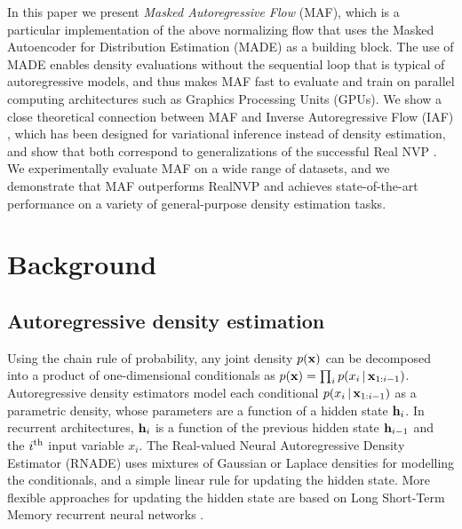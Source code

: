 In this paper we present \emph{Masked Autoregressive Flow} (MAF), which is a particular implementation of the above normalizing flow that uses the Masked Autoencoder for Distribution Estimation (MADE) \citep{Germain:2015} as a building block. The use of MADE enables density evaluations without the sequential loop that is typical of autoregressive models, and thus makes MAF fast to evaluate and train on parallel computing architectures such as Graphics Processing Units (GPUs). We show a close theoretical connection between MAF and Inverse Autoregressive Flow (IAF) \citep{Kingma:2016}, which has been designed for variational inference instead of density estimation, and show that both correspond to generalizations of the successful Real NVP \citep{Dinh:2017}. We experimentally evaluate MAF on a wide range of datasets, and we demonstrate that MAF outperforms RealNVP and achieves state-of-the-art performance on a variety of general-purpose density estimation tasks.


\section{Background}
\label{sec:background}

\subsection{Autoregressive density estimation}

Using the chain rule of probability, any joint density $p\mathopen{}\left(\mathbf{x}\right)\mathclose{}$ can be decomposed into a product of one-dimensional conditionals as
$p\mathopen{}\left(\mathbf{x}\right)\mathclose{} = \prod_i{p\mathopen{}\left(x_i\,|\,\mathbf{x}_{1:i-1}\right)\mathclose{}}$.
Autoregressive density estimators \citep{Uria:2017} model each conditional $p\mathopen{}\left(x_i\,|\,\mathbf{x}_{1:i-1}\right)\mathclose{}$ as a parametric density, whose parameters are a function of a hidden state $\mathbf{h}_i$. In recurrent architectures, 
$\mathbf{h}_i$ is a function of the previous hidden state $\mathbf{h}_{i-1}$ and the $i^{\text{th}}$ input variable $x_i$. The Real-valued Neural Autoregressive Density Estimator (RNADE) \citep{Uria:2013} uses mixtures of Gaussian or Laplace densities for modelling the conditionals, and a simple linear rule for updating the hidden state. More flexible approaches for updating the hidden state are based on Long Short-Term Memory recurrent neural networks \citep{Theis:2015, VanDenOord:2016:PixelRNN}.

